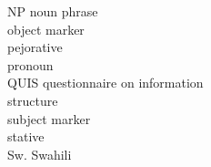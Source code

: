 \documentclass[output=paper]{langscibook}
\begin{document}
\begin{multicols}{2}
\begin{tabbing}
NP \> noun phrase\\
\OM{} \> object marker \\
\PEJ{} \> pejorative\\
\PRO{} \> pronoun \\
QUIS \> questionnaire on information \\ \> structure \citep{SkopeteasEtAl2006}\\
\SM{} \> subject marker\\
\STAT{} \> stative\\
Sw. \> Swahili
\end{tabbing}
\end{multicols}

\printbibliography[heading=subbibliography,notkeyword=this]
\end{document}
